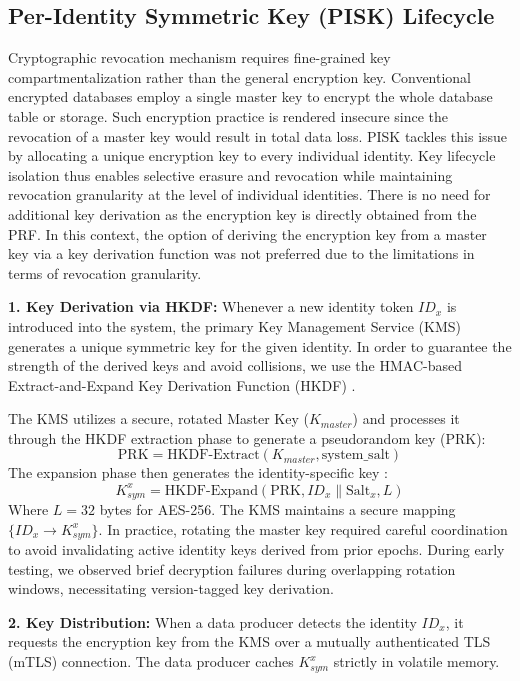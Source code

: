 \documentclass[conference]{IEEEtran}
\begin{document}
\subsection{Per-Identity Symmetric Key (PISK) Lifecycle}
Cryptographic revocation mechanism requires fine-grained key compartmentalization rather than the general encryption key. Conventional encrypted databases employ a single master key to encrypt the whole database table or storage. Such encryption practice is rendered insecure since the revocation of a master key would result in total data loss. PISK tackles this issue by allocating a unique encryption key to every individual identity. Key lifecycle isolation thus enables selective erasure and revocation while maintaining revocation granularity at the level of individual identities. There is no need for additional key derivation as the encryption key is directly obtained from the PRF.
In this context, the option of deriving the encryption key from a master key via a key derivation function was not preferred due to the limitations in terms of revocation granularity.

\textbf{1. Key Derivation via HKDF:} Whenever a new identity token $ID_x$ is introduced into the system, the primary Key Management Service (KMS) generates a unique symmetric key for the given identity. In order to guarantee the strength of the derived keys and avoid collisions, we use the HMAC-based Extract-and-Expand Key Derivation Function (HKDF) \cite{b13}.

The KMS utilizes a secure, rotated Master Key ($K_{master}$) and processes it through the HKDF extraction phase to generate a pseudorandom key (PRK):
\begin{equation}
\text{PRK} = \text{HKDF-Extract}(K_{master}, \text{system\_salt})
\end{equation}
The expansion phase then generates the identity-specific key \cite{b27}:
\begin{equation}
K_{sym}^{x} = \text{HKDF-Expand}(\text{PRK}, ID_x \parallel \text{Salt}_x, L)
\end{equation}
Where $L=32$ bytes for AES-256. The KMS maintains a secure mapping $\{ID_x \to K_{sym}^{x}\}$. In practice, rotating the master key required careful coordination to avoid invalidating active identity keys derived from prior epochs. During early testing, we observed brief decryption failures during overlapping rotation windows, necessitating version-tagged key derivation.

\textbf{2. Key Distribution:} When a data producer detects the identity $ID_x$, it requests the encryption key from the KMS over a mutually authenticated TLS (mTLS) connection. The data producer caches $K_{sym}^{x}$ strictly in volatile memory.
\end{document}

